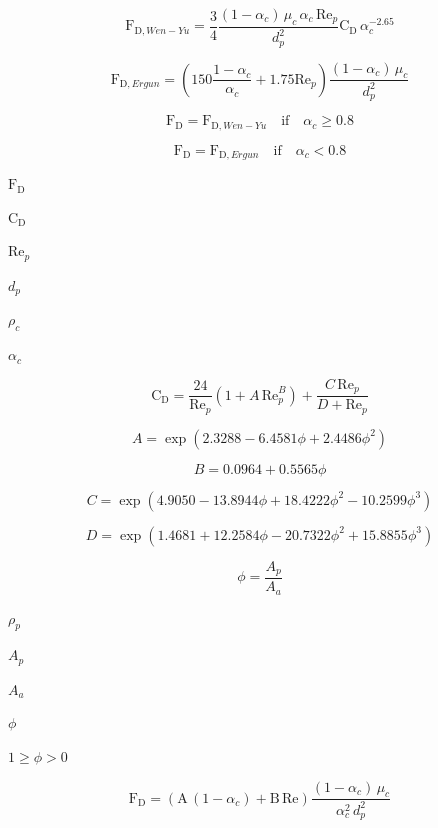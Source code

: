 \documentclass{article}
\begin{document}
\[
    \mathrm{F}_{\mathrm{D}, Wen-Yu} =
        \frac{3}{4}
        \frac{(1 - \alpha_c) \, \mu_c \, \alpha_c \, \mathrm{Re}_p }{d_p^2}
        \mathrm{C}_\mathrm{D} \, \alpha_c^{-2.65}
\]
\pagebreak

\[
    \mathrm{F}_{\mathrm{D}, Ergun} =
        \left(150 \frac{1-\alpha_c}{\alpha_c} + 1.75 \mathrm{Re}_p \right)
        \frac{(1-\alpha_c) \, \mu_c}{d_p^2}
\]
\pagebreak

\[
    \mathrm{F}_\mathrm{D} = \mathrm{F}_{\mathrm{D}, Wen-Yu}
        \quad \mathrm{if} \quad \alpha_c \geq 0.8
\]
\pagebreak

\[
    \mathrm{F}_\mathrm{D} = \mathrm{F}_{\mathrm{D}, Ergun}
        \quad \mathrm{if} \quad \alpha_c < 0.8
\]
\pagebreak

$        \mathrm{F}_\mathrm{D} $
\pagebreak

$        \mathrm{C}_\mathrm{D} $
\pagebreak

$        \mathrm{Re}_p         $
\pagebreak

$        d_p                   $
\pagebreak

$        \rho_c   $
\pagebreak

$        \alpha_c              $
\pagebreak

\[
    \mathrm{C}_\mathrm{D} =
        \frac{24}{\mathrm{Re}_p} \left( 1 + A \, \mathrm{Re}_p^B \right)
      + \frac{C \, \mathrm{Re}_p}{D + \mathrm{Re}_p}
\]
\pagebreak

\[
    A = \exp(2.3288 - 6.4581\phi + 2.4486 \phi^2)
\]
\pagebreak

\[
    B = 0.0964 + 0.5565\phi
\]
\pagebreak

\[
    C = \exp(4.9050 - 13.8944\phi + 18.4222\phi^2 - 10.2599 \phi^3)
\]
\pagebreak

\[
    D = \exp(1.4681 + 12.2584\phi - 20.7322\phi^2 + 15.8855\phi^3)
\]
\pagebreak

\[
    \phi = \frac{A_p}{A_a}
\]
\pagebreak

$        \rho_p                $
\pagebreak

$        A_p        $
\pagebreak

$        A_a           $
\pagebreak

$        \phi          $
\pagebreak

$ 1 \geq \phi > 0 $
\pagebreak

\[
    \mathrm{F}_\mathrm{D} =
        \left(\mathrm{A}\, (1-\alpha_c) + \mathrm{B}\, \mathrm{Re}\right)
        \frac{(1-\alpha_c)\, \mu_c}{\alpha_c^2\, d_p^2}
\]
\pagebreak
\end{document}
